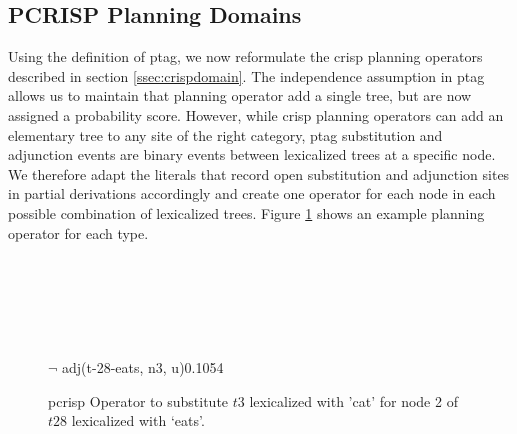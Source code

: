 \subsection{PCRISP Planning Domains}
\label{ssec:pcrisp-domains}
Using the definition of {\sc ptag}, we now reformulate the {\sc crisp} planning operators described in section \ref{ssec:crispdomain}.
The independence assumption in {\sc ptag} allows us to maintain that planning operator add a single tree, but are now assigned a probability score. However, while {\sc crisp} planning operators can add an elementary tree to any site of the right category, {\sc ptag} substitution and adjunction events are binary events between lexicalized trees at a specific node. We therefore adapt the literals that record open substitution and adjunction sites in partial derivations accordingly and create one operator for each node in each possible combination of lexicalized trees.
Figure \ref{example-action} shows an example planning operator for each type.
\begin{figure}[t]
\begin{center}
\\\smallskip

\\\smallskip

\\\smallskip

{$\lnot$ adj(t-28-eats, n3, u)}{0.1054}\\\smallskip

\caption{\label{example-action} {\sc pcrisp} Operator to substitute $t3$ lexicalized with 'cat' for node 2 of $t28$ lexicalized with `eats'.}
\end{center}
\end{figure}


